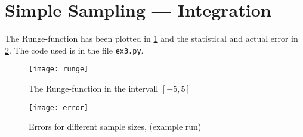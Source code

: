 \documentclass[a4paper,11pt,bibtotoc]{scrartcl}
\begin{document}
\section{Simple Sampling --- Integration}

The Runge-function has been plotted in \cref{fig:runge} and the statistical and
actual error in \cref{fig:error}. The code used is in the file \texttt{ex3.py}.

\begin{figure}[htb]
    \centering
    \texttt{[image: runge]}
    \caption{The Runge-function in the intervall $[-5,5]$}
    \label{fig:runge}
\end{figure}

\begin{figure}[htb]
    \centering
    \texttt{[image: error]}
    \caption{Errors for different sample sizes, (example run)}
    \label{fig:error}
\end{figure}
\end{document}
